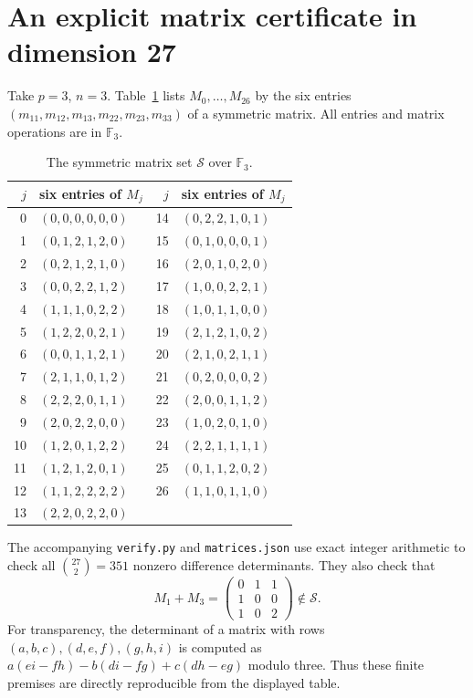 \documentclass[11pt]{article}
\newcommand{\F}{\mathbb F}
\newcommand{\Sset}{\mathcal S}
\begin{document}
\section{An explicit matrix certificate in dimension 27}
Take $p=3$, $n=3$. Table~\ref{tab:matrices} lists $M_0,\ldots,M_{26}$ by the six entries $(m_{11},m_{12},m_{13},m_{22},m_{23},m_{33})$ of a symmetric matrix. All entries and matrix operations are in $\F_3$.
\begin{table}[ht]
\centering\small
\begin{tabular}{r@{\quad}l@{\qquad}r@{\quad}l}
\toprule
$j$ & six entries of $M_j$ & $j$ & six entries of $M_j$\\\midrule
0 & $(0,0,0,0,0,0)$ & 14 & $(0,2,2,1,0,1)$\\
1 & $(0,1,2,1,2,0)$ & 15 & $(0,1,0,0,0,1)$\\
2 & $(0,2,1,2,1,0)$ & 16 & $(2,0,1,0,2,0)$\\
3 & $(0,0,2,2,1,2)$ & 17 & $(1,0,0,2,2,1)$\\
4 & $(1,1,1,0,2,2)$ & 18 & $(1,0,1,1,0,0)$\\
5 & $(1,2,2,0,2,1)$ & 19 & $(2,1,2,1,0,2)$\\
6 & $(0,0,1,1,2,1)$ & 20 & $(2,1,0,2,1,1)$\\
7 & $(2,1,1,0,1,2)$ & 21 & $(0,2,0,0,0,2)$\\
8 & $(2,2,2,0,1,1)$ & 22 & $(2,0,0,1,1,2)$\\
9 & $(2,0,2,2,0,0)$ & 23 & $(1,0,2,0,1,0)$\\
10 & $(1,2,0,1,2,2)$ & 24 & $(2,2,1,1,1,1)$\\
11 & $(1,2,1,2,0,1)$ & 25 & $(0,1,1,2,0,2)$\\
12 & $(1,1,2,2,2,2)$ & 26 & $(1,1,0,1,1,0)$\\
13 & $(2,2,0,2,2,0)$ & &\\\bottomrule
\end{tabular}
\caption{The symmetric matrix set $\Sset$ over $\F_3$.}\label{tab:matrices}
\end{table}

The accompanying \texttt{verify.py} and \texttt{matrices.json} use exact integer arithmetic to check all $\binom{27}{2}=351$ nonzero difference determinants. They also check that
\begin{equation}\label{eq:witness}
M_1+M_3=
\begin{pmatrix}0&1&1\\1&0&0\\1&0&2\end{pmatrix}\notin\Sset.
\end{equation}
For transparency, the determinant of a matrix with rows $(a,b,c),(d,e,f),(g,h,i)$ is computed as $a(ei-fh)-b(di-fg)+c(dh-eg)$ modulo three. Thus these finite premises are directly reproducible from the displayed table.
\end{document}
